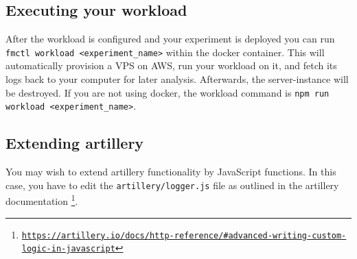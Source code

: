 \documentclass[../main.tex]{subfiles}
\begin{document}
\subsection{Executing your workload}

After the workload is configured and your experiment is deployed you can run \texttt{fmctl workload <experiment\_name>} 
within the docker container. This will automatically provision a VPS on AWS, run your workload on it, and
fetch its logs back to your computer for later analysis. Afterwards, the server-instance will be destroyed.
If you are not using docker, the workload command is \texttt{npm run workload <experiment\_name>}.

\subsection{Extending artillery}

You may wish to extend artillery functionality by JavaScript functions.
In this case, you have to edit the \texttt{artillery/logger.js} file as outlined in the artillery documentation%
\footnote{\href{https://artillery.io/docs/http-reference}%
{\texttt{https://artillery.io/docs/http-reference/\#advanced-writing-custom-logic-in-javascript}}}.
\end{document}

